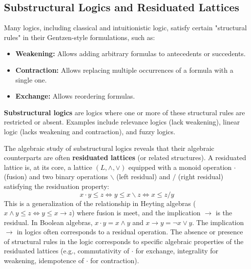 \subsection{Substructural Logics and Residuated Lattices}

Many logics, including classical and intuitionistic logic, satisfy certain "structural rules" in their Gentzen-style formulations, such as:
\begin{itemize}
    \item \textbf{Weakening:} Allows adding arbitrary formulas to antecedents or succedents.
    \item \textbf{Contraction:} Allows replacing multiple occurrences of a formula with a single one.
    \item \textbf{Exchange:} Allows reordering formulas.
\end{itemize}
\textbf{Substructural logics} are logics where one or more of these structural rules are restricted or absent. Examples include relevance logics (lack weakening), linear logic (lacks weakening and contraction), and fuzzy logics.

The algebraic study of substructural logics reveals that their algebraic counterparts are often \textbf{residuated lattices} (or related structures).
A residuated lattice is, at its core, a lattice $(L, \land, \lor)$ equipped with a monoid operation $\cdot$ (fusion) and two binary operations $\backslash$ (left residual) and $/$ (right residual) satisfying the residuation property:
\[ x \cdot y \le z \iff y \le x \backslash z \iff x \le z / y \]
This is a generalization of the relationship in Heyting algebras ($x \land y \le z \iff y \le x \to z$) where fusion is meet, and the implication $\to$ is the residual. In Boolean algebras, $x \cdot y = x \land y$ and $x \to y = \neg x \lor y$. The implication $\to$ in logics often corresponds to a residual operation.
The absence or presence of structural rules in the logic corresponds to specific algebraic properties of the residuated lattices (e.g., commutativity of $\cdot$ for exchange, integrality for weakening, idempotence of $\cdot$ for contraction).





















